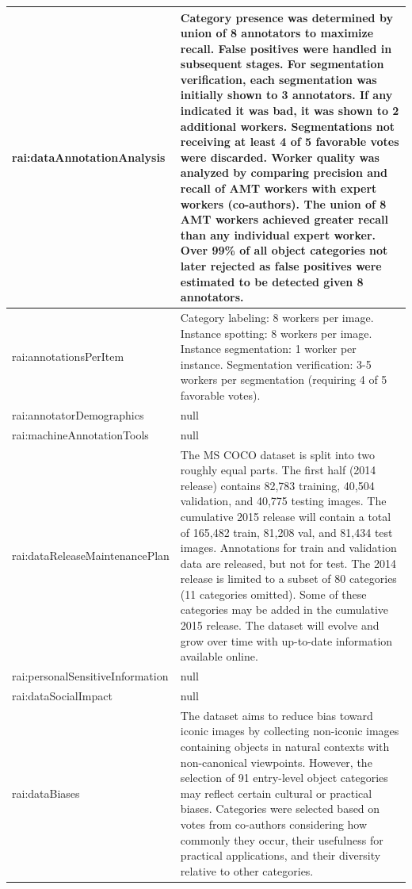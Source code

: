 \documentclass[10pt,a4paper]{article}
\begin{document}
\begin{longtable}{|p{4cm}|p{12cm}|}
\hline
rai:dataAnnotationAnalysis & Category presence was determined by union of 8 annotators to maximize recall. False positives were handled in subsequent stages. For segmentation verification, each segmentation was initially shown to 3 annotators. If any indicated it was bad, it was shown to 2 additional workers. Segmentations not receiving at least 4 of 5 favorable votes were discarded. Worker quality was analyzed by comparing precision and recall of AMT workers with expert workers (co-authors). The union of 8 AMT workers achieved greater recall than any individual expert worker. Over 99\% of all object categories not later rejected as false positives were estimated to be detected given 8 annotators. \\
\hline
rai:annotationsPerItem & Category labeling: 8 workers per image. Instance spotting: 8 workers per image. Instance segmentation: 1 worker per instance. Segmentation verification: 3-5 workers per segmentation (requiring 4 of 5 favorable votes). \\
\hline
rai:annotatorDemographics & null \\
\hline
rai:machineAnnotationTools & null \\
\hline
rai:dataReleaseMaintenancePlan & The MS COCO dataset is split into two roughly equal parts. The first half (2014 release) contains 82,783 training, 40,504 validation, and 40,775 testing images. The cumulative 2015 release will contain a total of 165,482 train, 81,208 val, and 81,434 test images. Annotations for train and validation data are released, but not for test. The 2014 release is limited to a subset of 80 categories (11 categories omitted). Some of these categories may be added in the cumulative 2015 release. The dataset will evolve and grow over time with up-to-date information available online. \\
\hline
rai:personalSensitiveInformation & null \\
\hline
rai:dataSocialImpact & null \\
\hline
rai:dataBiases & The dataset aims to reduce bias toward iconic images by collecting non-iconic images containing objects in natural contexts with non-canonical viewpoints. However, the selection of 91 entry-level object categories may reflect certain cultural or practical biases. Categories were selected based on votes from co-authors considering how commonly they occur, their usefulness for practical applications, and their diversity relative to other categories. \\
\hline

\end{longtable}
\end{document}
